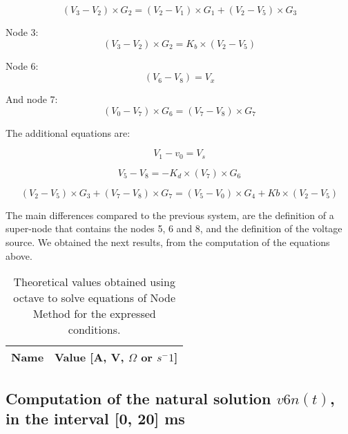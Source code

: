 \begin {equation}
  (V_3 - V_2)\times G_2 = (V_2 - V_1)\times G_1 + (V_2 - V_5)\times G_3
\end{equation}

Node 3:
\begin{equation}
(V_3- V_2)\times G_2 = K_b\times (V_2 - V_5)
\end{equation}

Node 6:
\begin {equation}
(V_6 - V_8)= V_x
\end{equation}

And node 7:
\begin {equation}
(V_0-V_7)\times G_6 = (V_7 - V_8)\times G_7
\end{equation}

The additional equations are:

\begin {equation}
V_1 - v_0= V_s
\end{equation}

\begin {equation}
V_5 - V_8 = -K_d\times (V_7)\times G_6
\end{equation}

\begin {equation}
  (V_2 - V_5)\times G_3 + (V_7 - V_8)\times G_7 = (V_5 - V_0)\times G_4 + Kb\times(V_2 - V_5)
\end{equation}

The main differences compared to the previous system, are the definition of a super-node that contains the nodes 5, 6 and 8, and the definition of the voltage source. We obtained the next results, from the computation of the equations above.

\begin{table}[h]
  \centering
  \begin{tabular}{|l|r|}
    \hline    
    {\bf Name} & {\bf Value [A, V, $\Omega$ or $s^-1$]} \\ \hline
    
  \end{tabular}
  \caption{Theoretical values obtained using octave to solve equations of Node Method for the expressed conditions.}
  \label{tab:ocatvevalues2}
\end{table}

\subsection{Computation of the natural solution $v6n(t)$, in the interval [0, 20] ms}



